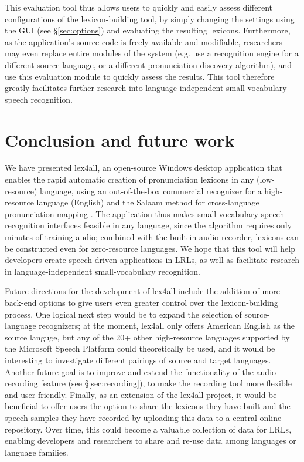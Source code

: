 \documentclass[11pt]{article}
\begin{document}
This evaluation tool thus allows users to quickly and easily assess different configurations of the lexicon-building tool, by simply changing the settings using the GUI (see \S\ref{sec:options}) and evaluating the resulting lexicons. Furthermore, as the application's source code is freely available and modifiable, researchers may even replace entire modules of the system (e.g. use a recognition engine for a different source language, or a different pronunciation-discovery algorithm), and use this evaluation module to quickly assess the results. This tool therefore greatly facilitates further research into language-independent small-vocabulary speech recognition. 

\section{Conclusion and future work}
\label{sec:future}

We have presented lex4all, an open-source Windows desktop application that enables the rapid automatic creation of pronunciation lexicons in any (low-resource) language, using an out-of-the-box commercial recognizer \cite{mspsdk} for a high-resource language (English) and the Salaam method for cross-language pronunciation mapping \cite{Qiao10,Chan12}. The application thus makes small-vocabulary speech recognition interfaces feasible in any language, since the algorithm requires only minutes of training audio; combined with the built-in audio recorder, lexicons can be constructed even for zero-resource languages. We hope that this tool will help developers create speech-driven applications in LRLs, as well as facilitate research in language-independent small-vocabulary recognition.

Future directions for the development of lex4all include the addition of more back-end options to give users even greater control over the lexicon-building process. One logical next step would be to expand the selection of source-language recognizers; at the moment, lex4all only offers American English as the source languge, but any of the 20+ other high-resource languages supported by the Microsoft Speech Platform \cite{mspsdk} could theoretically be used, and it would be interesting to investigate different pairings of source and target languages. Another future goal is to improve and extend the functionality of the audio-recording feature (see \S\ref{sec:recording}), 
to make the recording tool more flexible and user-friendly.
Finally, as an extension of the lex4all project, it would be beneficial to offer users the option to share the lexicons they have built and the speech samples they have recorded by uploading this data to a central online repository. Over time, this could become a valuable collection of data for LRLs, enabling developers and researchers to share and re-use data among languages or language families.
\end{document}
